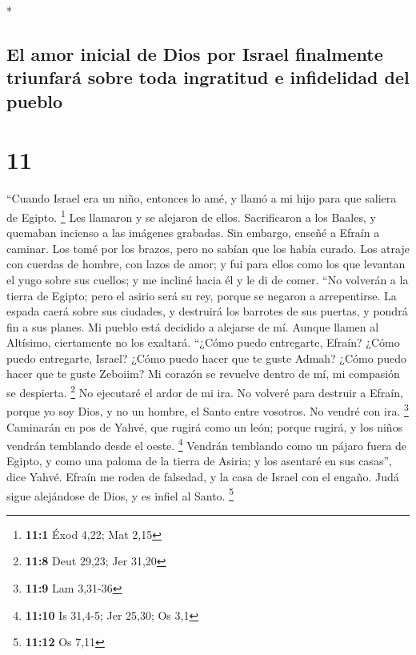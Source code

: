 \begin{paracol}{2}
\switchcolumn[0]*

\hypertarget{el-amor-inicial-de-dios-por-israel-finalmente-triunfaruxe1-sobre-toda-ingratitud-e-infidelidad-del-pueblo}{%
\subsection{El amor inicial de Dios por Israel finalmente triunfará
sobre toda ingratitud e infidelidad del
pueblo}\label{el-amor-inicial-de-dios-por-israel-finalmente-triunfaruxe1-sobre-toda-ingratitud-e-infidelidad-del-pueblo}}

\hypertarget{section-20}{%
\section{11}\label{section-20}}

 ``Cuando Israel era un niño, entonces lo amé, y llamó a
mi hijo para que saliera de Egipto. \footnote{\textbf{11:1} Éxod 4,22;
  Mat 2,15}  Les llamaron y se alejaron de ellos.
Sacrificaron a los Baales, y quemaban incienso a las imágenes grabadas.
 Sin embargo, enseñé a Efraín a caminar. Los tomé por los
brazos, pero no sabían que los había curado.  Los atraje
con cuerdas de hombre, con lazos de amor; y fui para ellos como los que
levantan el yugo sobre sus cuellos; y me incliné hacia él y le di de
comer.  ``No volverán a la tierra de Egipto; pero el
asirio será su rey, porque se negaron a arrepentirse.  La
espada caerá sobre sus ciudades, y destruirá los barrotes de sus
puertas, y pondrá fin a sus planes.  Mi pueblo está
decidido a alejarse de mí. Aunque llamen al Altísimo, ciertamente no los
exaltará.  ``¿Cómo puedo entregarte, Efraín? ¿Cómo puedo
entregarte, Israel? ¿Cómo puedo hacer que te guste Admah? ¿Cómo puedo
hacer que te guste Zeboiim? Mi corazón se revuelve dentro de mí, mi
compasión se despierta. \footnote{\textbf{11:8} Deut 29,23; Jer 31,20}
 No ejecutaré el ardor de mi ira. No volveré para destruir
a Efraín, porque yo soy Dios, y no un hombre, el Santo entre vosotros.
No vendré con ira. \footnote{\textbf{11:9} Lam 3,31-36} 
Caminarán en pos de Yahvé, que rugirá como un león; porque rugirá, y los
niños vendrán temblando desde el oeste. \footnote{\textbf{11:10} Is
  31,4-5; Jer 25,30; Os 3,1}  Vendrán temblando como un
pájaro fuera de Egipto, y como una paloma de la tierra de Asiria; y los
asentaré en sus casas'', dice Yahvé.  Efraín me rodea de
falsedad, y la casa de Israel con el engaño. Judá sigue alejándose de
Dios, y es infiel al Santo. \footnote{\textbf{11:12} Os 7,11}


\end{paracol}
